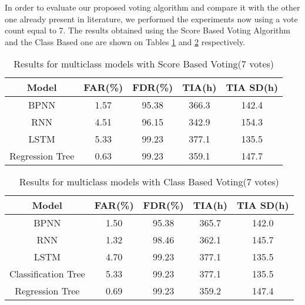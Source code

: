 In order to evaluate our proposed voting algorithm and compare it with the other one already present in literature, we performed the experiments now using a vote count equal to 7.
The results obtained using the Score Based Voting Algorithm and the Class Based one are shown on Tables \ref{table:results_multiclass_score_multi_vote} and \ref{table:results_multiclass_class_multi_vote} respectively.

\begin{table}
  \begin{center}
    \begin{tabular}{|c|c|c|c|c|}
      \hline
    Model & FAR(\%) & FDR(\%) & TIA(h) & TIA SD(h) \\
    \hline
    BPNN & 1.57 & 95.38 & 366.3 & 142.4 \\
    RNN & 4.51 & 96.15 & 342.9 & 154.3 \\
    LSTM & 5.33 & 99.23 & 377.1 & 135.5 \\
    Regression Tree & 0.63 & 99.23 & 359.1 & 147.7 \\
    \hline
    \end{tabular}
    \caption[Results Multiclass Models, Score Voting, 7 votes]{Results for multiclass models with Score Based Voting(7 votes)}
    \label{table:results_multiclass_score_multi_vote}
  \end{center}
\end{table}

\begin{table}
  \begin{center}
    \begin{tabular}{|c|c|c|c|c|}
      \hline
    Model & FAR(\%) & FDR(\%) & TIA(h) & TIA SD(h) \\
    \hline
    BPNN & 1.50 & 95.38 & 365.7 & 142.0 \\
    RNN & 1.32 & 98.46 & 362.1 & 145.7 \\
    LSTM & 4.70 & 99.23 & 377.1 & 135.5\\
    Classification Tree & 5.33 & 99.23 & 377.1 & 135.5 \\
    Regression Tree & 0.69 & 99.23 & 359.2 & 147.4 \\
    \hline
    \end{tabular}
    \caption[Results Multiclass Models, Class Voting, 7 votes]{Results for multiclass models with Class Based Voting(7 votes)}
    \label{table:results_multiclass_class_multi_vote}
  \end{center}
\end{table}

